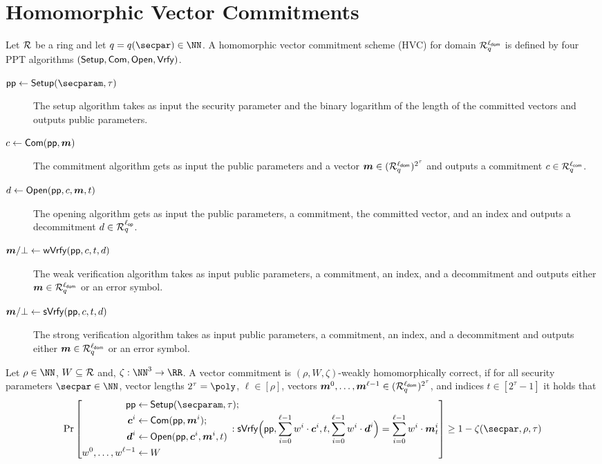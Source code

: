 \section{Homomorphic Vector Commitments}\label{sec:veccom}

\begin{definition}\label{def:hvc}
  Let $\mathcal{R}$ be a ring and let $q=q(\secpar)\in\NN$.
  A homomorphic vector commitment scheme (HVC) for domain $\mathcal{R}^{\ell_{\mathsf{dom}}}_q$ is defined by four PPT algorithms $(\mathsf{Setup},\mathsf{Com},\allowbreak\mathsf{Open},\mathsf{Vrfy})$.
\begin{description}
    \item[$\params\gets\setup(\secparam,\tau)$] The setup algorithm takes as input the security parameter and the binary logarithm of the length of the committed vectors and outputs public parameters.
    \item[$c \gets \mathsf{Com}(\mathsf{pp},\boldsymbol{m})$] The commitment algorithm gets as input the public parameters and a vector $\boldsymbol{m}\in(\mathcal{R}_q^{\ell_{\mathsf{dom}}})^{2^\tau}$ and outputs a commitment $c\in\mathcal{R}_q^{\ell_{\mathsf{com}}}$.
    \item[$d \gets \mathsf{Open}(\mathsf{pp},c,\boldsymbol{m},t)$] The opening algorithm gets as input the public parameters, a commitment, the committed vector, and an index and outputs a decommitment $d\in\mathcal{R}_q^{{\ell_{\mathsf{op}}}}$.
    \item[$\boldsymbol{m}/\bot\gets \mathsf{wVrfy}(\mathsf{pp},c,t,d)$] The weak verification algorithm takes as input public parameters, a commitment, an index, and a decommitment and outputs either $\boldsymbol{m}\in\mathcal{R}^{\ell_{\mathsf{dom}}}_q$ or an error symbol.
    \item[$\boldsymbol{m}/\bot\gets \mathsf{sVrfy}(\mathsf{pp},c,t,d)$] The strong verification algorithm takes as input public parameters, a commitment, an index, and a decommitment and outputs either $\boldsymbol{m}\in\mathcal{R}^{\ell_{\mathsf{dom}}}_q$ or an error symbol.
  \end{description}
  Let $\rho\in\NN$, $W\subseteq\mathcal{R}$ and, $\zeta : \NN^3 \to \RR$.
  A vector commitment is $(\rho,W,\zeta)$-weakly homomorphically correct, if for all security parameters $\secpar\in\NN$, vector lengths $2^\tau=\poly$, $\ell\in[\rho]$, vectors $\boldsymbol{m}^0,\dots,\boldsymbol{m}^{\ell-1}\in(\mathcal{R}_q^{\ell_{\mathsf{dom}}})^{2^\tau}$, and indices $t\in[2^\tau-1]$ it holds that
  \[
    \Pr\left[
      \begin{aligned}
      \params\gets&\mspace{\medmuskip}\setup(\secparam,\tau);\\
      \vec{c}^i \gets&\mspace{\medmuskip} \commit(\params,\vec{m}^i);\\
      \vec{d}^i \gets&\mspace{\medmuskip} \open(\params,\vec{c}^i,\vec{m}^i,t)\\
      w^0,\dots,w^{\ell-1} \gets&\mspace{\medmuskip} W
      \end{aligned}\!\!\!\!\!\!:
      \sverify\Bigl(\params,\sum_{i=0}^{\ell-1}w^i\cdot \vec{c}^i,t,\sum_{i=0}^{\ell-1}w^i\cdot \vec{d}^i\Bigr) = \sum_{i=0}^{\ell-1}w^i\cdot\vec{m}^i_{t}
    \right] \geq 1-\zeta(\secpar,\rho,\tau)
  \]
\end{definition}

